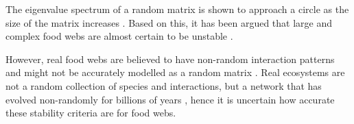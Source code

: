 The eigenvalue spectrum of a random matrix is shown to approach a circle as the size of the matrix increases \cite{tao2010random}. Based on this, it has been argued that large and complex food webs are almost certain to be unstable \cite{may1972will}.

However, real food webs are believed to have non-random interaction patterns and might not be accurately modelled as a random matrix \cite{sih1990interacting, allesina2012stability}.
Real ecosystems are not a random collection of species and interactions, but a network that has evolved non-randomly for billions of years \cite{weiss1998evolution}, hence it is uncertain how accurate these stability criteria are for food webs.

